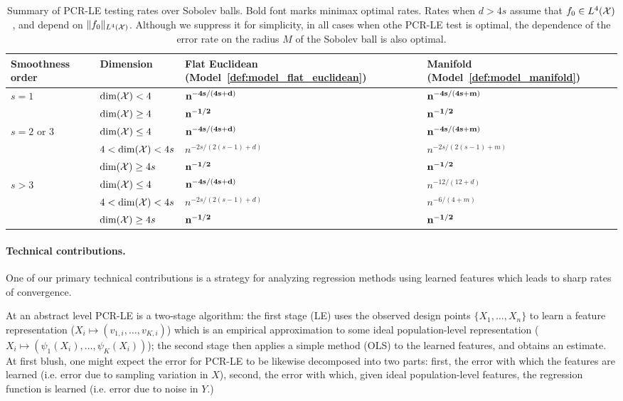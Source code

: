 \begin{table}
	\begin{center}
		\begin{tabular}{p{} p{} | p{} p{} }
			Smoothness order & Dimension & Flat Euclidean (Model~\ref{def:model_flat_euclidean}) & Manifold (Model~\ref{def:model_manifold}) \\
			\hline
			\multirow{2}{*}{$s = 1$} & $\dim(\mathcal{X}) < 4$ & ${\bf n^{-4s/(4s + d)}}$ & ${\bf n^{-4s/(4s + m)}}$ \\
			& $\dim(\mathcal{X}) \geq 4$ & ${\bf n^{-1/2}}$ & ${\bf n^{-1/2}}$ \\
			\hline
			\multirow{3}{*}{$s = 2$ or $3$} & $\dim(\mathcal{X}) \leq 4$  & ${\bf n^{-4s/(4s + d)}}$ & ${\bf n^{-4s/(4s + m)}}$ \\
			& $4 <\dim(\mathcal{X}) < 4s$  & $n^{-2s/(2(s - 1) + d)}$ & $n^{-2s/(2(s - 1) + m)}$\\
			& $\dim(\mathcal{X}) \geq 4s$ & ${\bf n^{-1/2}}$ & ${\bf n^{-1/2}}$ \\
			\hline
			\multirow{3}{*}{$s > 3$} & $\dim(\mathcal{X}) \leq 4$ & ${\bf n^{-4s/(4s + d)}}$ & $n^{-12/(12 + d)}$ \\
			& $4 < \dim(\mathcal{X}) < 4s$ & $n^{-2s/(2(s - 1) + d)}$ & $n^{-6/(4 + m)}$ \\
			& $\dim(\mathcal{X}) \geq 4s$ & ${\bf n^{-1/2}}$ & ${\bf n^{-1/2}}$ \\
		\end{tabular}
	\end{center}
	\caption{Summary of PCR-LE testing rates over Sobolev balls. Bold font marks minimax optimal rates. Rates when $d > 4s$ assume that $f_0 \in L^4(\mathcal{X})$, and depend on $\|f_0\|_{L^4(\mathcal{X})}$. Although we suppress it for simplicity, in all cases when othe PCR-LE test is optimal, the dependence of the error rate on the radius $M$ of the Sobolev ball is also optimal.}
	\label{tbl:testing_rates}
\end{table}

\paragraph{Technical contributions.}
One of our primary technical contributions is a strategy for analyzing regression methods using learned features which leads to sharp rates of convergence. 

At an abstract level PCR-LE is a two-stage algorithm: the first stage (LE) uses the observed design points $\{X_1,\ldots,X_n\}$ to learn a feature representation ($X_i \mapsto (v_{1,i},\ldots,v_{K,i})$) which is an empirical approximation to some ideal population-level representation ($X_i \mapsto (\psi_{1}(X_i),\ldots,\psi_{K}(X_i))$);  the second stage then applies a simple method (OLS) to the learned features, and obtains an estimate. At first blush, one might expect the error for PCR-LE to be likewise decomposed into two parts: first, the error with which the features are learned (i.e. error due to sampling variation in $X$), second, the error with which, given ideal population-level features, the regression function is learned (i.e. error due to noise in $Y$.) 

